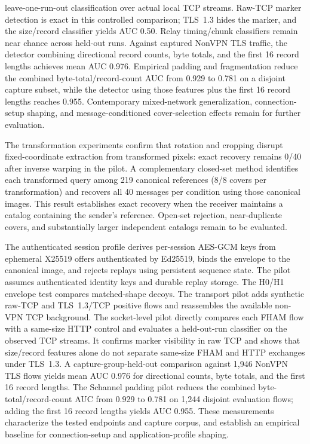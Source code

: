 \documentclass[preprint,12pt]{elsarticle}
\theoremstyle{plain}
\begin{document}
leave-one-run-out classification over actual local TCP streams. Raw-TCP marker
detection is exact in this controlled comparison; TLS~1.3 hides the marker,
and the size/record classifier yields AUC 0.50. Relay timing/chunk classifiers
remain near chance across held-out runs. Against captured NonVPN TLS traffic,
the detector combining directional record counts, byte totals, and the first
16 record lengths achieves mean AUC 0.976. Empirical padding and fragmentation
reduce the combined byte-total/record-count AUC from 0.929 to 0.781 on a
disjoint capture subset, while the detector using those features plus the
first 16 record lengths reaches 0.955. Contemporary
mixed-network generalization, connection-setup shaping, and message-conditioned
cover-selection effects remain for further evaluation.

The transformation experiments confirm that rotation and cropping disrupt
fixed-coordinate extraction from transformed pixels: exact recovery remains
0/40 after inverse warping in the pilot. A complementary closed-set method
identifies each transformed query among 219 canonical references (8/8 covers
per transformation) and recovers all 40 messages per condition using those
canonical images. This result establishes exact recovery when the receiver
maintains a catalog containing the sender's reference. Open-set rejection,
near-duplicate covers, and substantially larger independent catalogs remain
to be evaluated.

The authenticated session profile derives per-session AES-GCM keys from
ephemeral X25519 offers authenticated by Ed25519, binds the envelope to the
canonical image, and rejects replays using persistent sequence state. The
pilot assumes authenticated identity keys and durable replay storage. The
H0/H1 envelope test compares matched-shape decoys. The transport pilot adds
synthetic raw-TCP and TLS~1.3/TCP positive flows and reassembles the available
non-VPN TCP background. The socket-level pilot directly compares each FHAM
flow with a same-size HTTP control and evaluates a held-out-run classifier on
the observed TCP streams. It confirms marker visibility in raw TCP and shows
that size/record features alone do not separate same-size FHAM and HTTP
exchanges under TLS~1.3. A capture-group-held-out comparison against 1,946
NonVPN TLS flows yields mean AUC 0.976 for directional counts, byte totals,
and the first 16 record lengths. The Schannel padding pilot reduces the
combined byte-total/record-count AUC from 0.929 to 0.781 on 1,244 disjoint
evaluation flows; adding the first 16 record lengths yields AUC 0.955. These measurements characterize
the tested endpoints and capture corpus, and establish an empirical baseline
for connection-setup and application-profile shaping.
\end{document}
